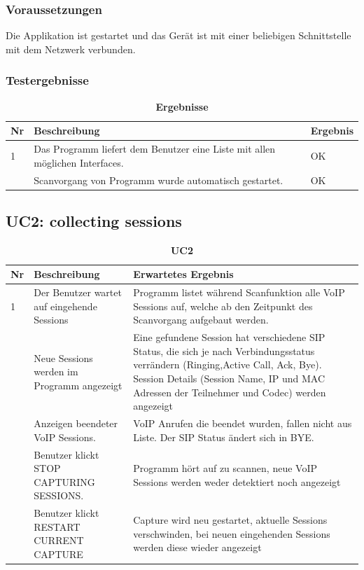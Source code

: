 \documentclass[a4,12pt]{scrartcl}
\begin{document}
\subsubsection{Voraussetzungen}
Die Applikation ist gestartet und das Gerät ist mit einer beliebigen Schnittstelle mit dem Netzwerk verbunden. 

\subsubsection{Testergebnisse}
\begin{table}[H]
\centering
    \begin{tabular}{@{} p{0.5cm} p{11cm} p{2cm} @{}}\toprule    
    {Nr} & {Beschreibung} & {Ergebnis}\\ \midrule
    1 & Das Programm liefert dem Benutzer eine Liste mit allen möglichen Interfaces. & OK\\ \addlinespace
   	2 & Scanvorgang von Programm wurde automatisch gestartet. & OK\\
    \bottomrule
    \end{tabular}
\caption{\textbf{Ergebnisse}}
\end{table}

\newpage

\subsection{UC2: collecting sessions}
\begin{table}[H]
\centering
    \begin{tabular}{@{} p{0.5cm} p{7cm} p{6cm} @{}}\toprule    
    {Nr} & {Beschreibung} & {Erwartetes Ergebnis}\\ \midrule
    1 & Der Benutzer wartet auf eingehende Sessions & Programm listet während Scanfunktion alle VoIP Sessions auf, welche ab den Zeitpunkt des Scanvorgang aufgebaut werden.\\ \addlinespace
    2 & Neue Sessions werden im Programm angezeigt & Eine gefundene Session hat verschiedene SIP Status, die sich je nach Verbindungsstatus verrändern (Ringing,Active Call, Ack, Bye). Session Details (Session Name, IP und MAC Adressen der Teilnehmer und Codec) werden angezeigt\\ \addlinespace
    3 & Anzeigen beendeter VoIP Sessions. & VoIP Anrufen die beendet wurden, fallen nicht aus Liste. Der SIP Status ändert sich in BYE.\\ \addlinespace
    4 & Benutzer klickt STOP CAPTURING SESSIONS. & Programm hört auf zu scannen, neue VoIP Sessions werden weder detektiert noch angezeigt\\ \addlinespace
    5 & Benutzer klickt RESTART CURRENT CAPTURE & Capture wird neu gestartet, aktuelle Sessions verschwinden, bei neuen eingehenden Sessions werden diese wieder angezeigt\\    
    \bottomrule
    \end{tabular}
\caption{\textbf{UC2}}
\end{table}
\end{document}
